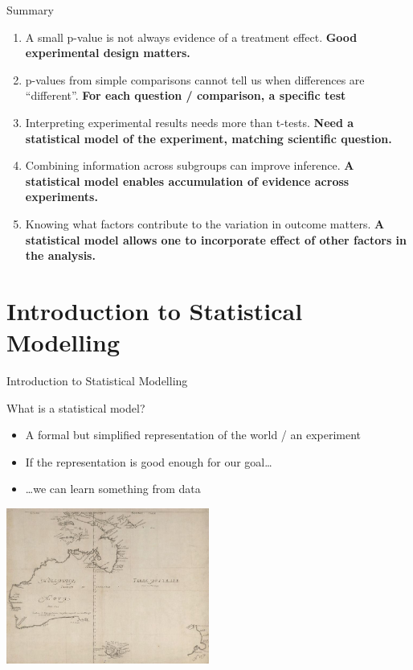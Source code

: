 \documentclass[10pt]{beamer}
\begin{document}
\begin{frame}{Summary}
 \begin{enumerate}[<+->]
  \item A small p-value is not always evidence of a treatment effect. \textbf{Good experimental design matters.}
  \item p-values from simple comparisons cannot tell us when differences are “different”. \textbf{For each question / comparison, a specific test}
  \item Interpreting experimental results needs more than t-tests. \textbf{Need a statistical model of the experiment, matching scientific question.}
  \item Combining information across subgroups can improve inference. \textbf{A statistical model enables accumulation of evidence across experiments.}
  \item Knowing what factors contribute to the variation in outcome matters. \textbf{A statistical model allows one to incorporate effect of other factors in the analysis.}
 \end{enumerate}

\end{frame}

\section{Introduction to Statistical Modelling}

\begin{frame}{Introduction to Statistical Modelling}
 
 \begin{block}{What is a statistical model?}
 \pause
   \begin{itemize}
      \item A formal but simplified representation of the world / an experiment
      \item If the representation is good enough for our goal\dots
      \item \dots we can learn something from data
    \end{itemize}
 \end{block}

 
 \pause
 \includegraphics[width=0.5\textwidth]{Figures/mapaus}
 

\end{frame}
\end{document}
